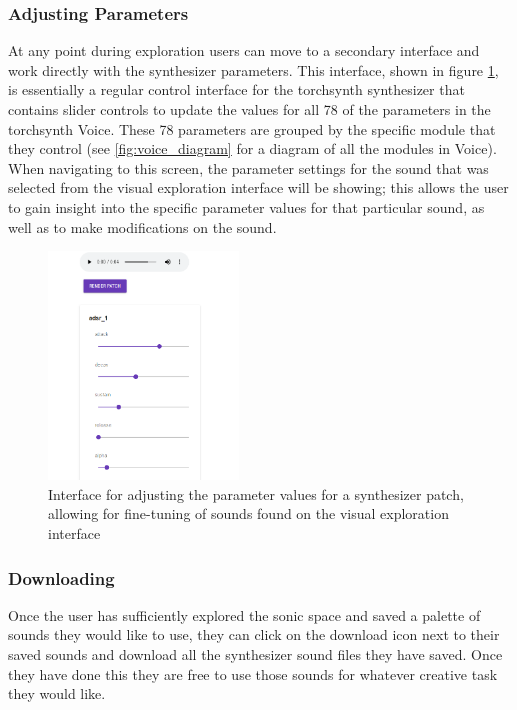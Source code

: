 \subsubsection{Adjusting Parameters}
At any point during exploration users can move to a secondary interface and work directly with the synthesizer parameters. This interface, shown in figure \ref{fig:adjusting-parameters}, is essentially a regular control interface for the torchsynth synthesizer that contains slider controls to update the values for all 78 of the parameters in the torchsynth Voice. These 78 parameters are grouped by the specific module that they control (see \ref{fig:voice_diagram} for a diagram of all the modules in Voice). When navigating to this screen, the parameter settings for the sound that was selected from the visual exploration interface will be showing; this allows the user to gain insight into the specific parameter values for that particular sound, as well as to make modifications on the sound.

\begin{figure}[ht]
    \centering
    \includegraphics[width=0.45\textwidth]{figures/synthexplore/SynthExplore-Adjust-Param-Cropped.png}
    \caption{Interface for adjusting the parameter values for a synthesizer patch, allowing for fine-tuning of sounds found on the visual exploration interface }
    \label{fig:adjusting-parameters}
\end{figure}

\subsubsection{Downloading}
Once the user has sufficiently explored the sonic space and saved a palette of sounds they would like to use, they can click on the download icon next to their saved sounds and download all the synthesizer sound files they have saved. Once they have done this they are free to use those sounds for whatever creative task they would like.

